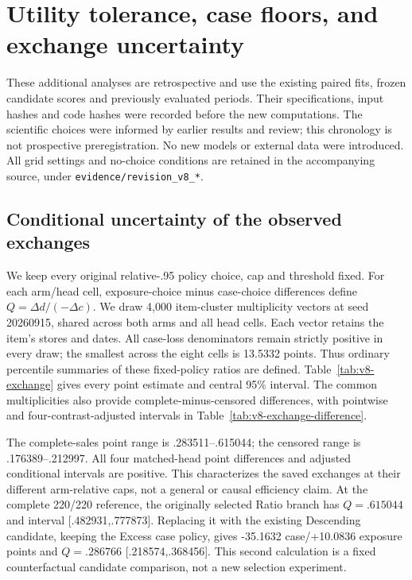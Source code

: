 \FloatBarrier
\section{Utility tolerance, case floors, and exchange uncertainty}
\label{app:v8}
These additional analyses are retrospective and use the existing paired fits, frozen candidate scores and previously evaluated periods. Their specifications, input hashes and code hashes were recorded before the new computations. The scientific choices were informed by earlier results and review; this chronology is not prospective preregistration. No new models or external data were introduced. All grid settings and no-choice conditions are retained in the accompanying source, under \texttt{evidence/revision\_v8\_*}.

\subsection{Conditional uncertainty of the observed exchanges}
\label{app:v8-exchange}
We keep every original relative-.95 policy choice, cap and threshold fixed. For each arm/head cell, exposure-choice minus case-choice differences define $Q=\Delta d/(-\Delta c)$. We draw 4,000 item-cluster multiplicity vectors at seed 20260915, shared across both arms and all head cells. Each vector retains the item's stores and dates. All case-loss denominators remain strictly positive in every draw; the smallest across the eight cells is 13.5332 points. Thus ordinary percentile summaries of these fixed-policy ratios are defined. Table~\ref{tab:v8-exchange} gives every point estimate and central 95\% interval. The common multiplicities also provide complete-minus-censored differences, with pointwise and four-contrast-adjusted intervals in Table~\ref{tab:v8-exchange-difference}.


The complete-sales point range is .283511--.615044; the censored range is .176389--.212997. All four matched-head point differences and adjusted conditional intervals are positive. This characterizes the saved exchanges at their different arm-relative caps, not a general or causal efficiency claim. At the complete 220/220 reference, the originally selected Ratio branch has $Q=.615044$ and interval [.482931,.777873]. Replacing it with the existing Descending candidate, keeping the Excess case policy, gives -35.1632 case/+10.0836 exposure points and $Q=.286766$ [.218574,.368456]. This second calculation is a fixed counterfactual candidate comparison, not a new selection experiment.

